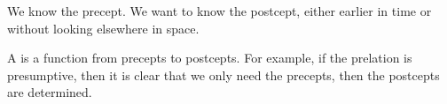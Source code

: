 
\sbasic







\sstart
{}


We know the precept.
We want to know the postcept,
either earlier in time
or without looking elsewhere
in space.


A  is a function from
precepts to postcepts.
For example,
if the prelation is presumptive,
then it is clear that we only
need the precepts, then the postcepts
are determined.
\strats
